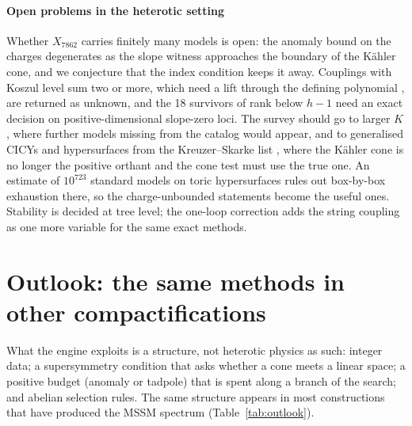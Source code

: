 \documentclass[10pt,a4paper]{article}
\newcommand{\Xa}{X_{7862}}
\begin{document}
\paragraph{Open problems in the heterotic setting} Whether $\Xa$ carries
finitely many models is open: the anomaly bound on the charges degenerates as
the slope witness approaches the boundary of the Kähler cone, and we conjecture
that the index condition keeps it away. Couplings with Koszul level sum two or
more, which need a lift through the defining polynomial \cite{BBL17}, are
returned as unknown, and the 18 survivors of rank below $h-1$ need an exact
decision on positive-dimensional slope-zero loci. The survey should go to
larger $K$, where further models missing from the catalog would appear, and to
generalised CICYs \cite{AAGGL15} and hypersurfaces from the Kreuzer--Skarke
list \cite{KS00,AGHJN14}, where the Kähler cone is no longer the positive
orthant and the cone test must use the true one. An estimate of $10^{723}$
standard models on toric hypersurfaces \cite{CHL18} rules out box-by-box
exhaustion there, so the charge-unbounded statements become the useful ones.
Stability is decided at tree level; the one-loop correction \cite{BHW05} adds
the string coupling as one more variable for the same exact methods.

\newpage
\section{Outlook: the same methods in other compactifications}

What the engine exploits is a structure, not heterotic physics as such:
integer data; a supersymmetry condition that asks whether a cone meets a linear
space; a positive budget (anomaly or tadpole) that is spent along a branch of
the search; and abelian selection rules. The same structure appears in most
constructions that have produced the MSSM spectrum (Table~\ref{tab:outlook}).
\end{document}
